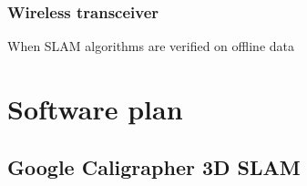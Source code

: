 \subsubsection{Wireless transceiver}
When SLAM algorithms are verified on offline data 


\section{Software plan}
\subsection{Google Caligrapher 3D SLAM}